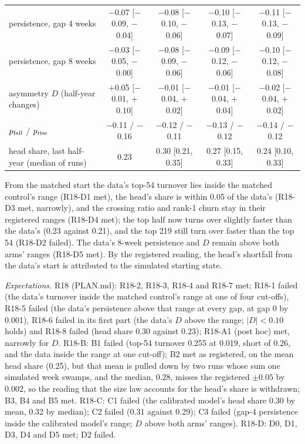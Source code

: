 \documentclass[10pt]{article}
\begin{document}
\begin{center}
{\begin{tabular}{lcccc}
persistence, gap 4 weeks & $-$0.07 [$-$0.09, $-$0.04] & $-$0.08 [$-$0.10, $-$0.06] & $-$0.10 [$-$0.13, $-$0.07] & $-$0.11 [$-$0.13, $-$0.09]\\
persistence, gap 8 weeks & $-$0.03 [$-$0.05, $-$0.00] & $-$0.08 [$-$0.09, $-$0.06] & $-$0.09 [$-$0.12, $-$0.06] & $-$0.10 [$-$0.12, $-$0.08]\\
asymmetry $D$ (half-year changes) & $+$0.05 [$-$0.01, $+$0.10] & $-$0.01 [$-$0.04, $+$0.02] & $-$0.01 [$-$0.04, $+$0.04] & $-$0.02 [$-$0.04, $+$0.02]\\
\quad $p_{\rm fall}$ / $p_{\rm rise}$ & $-$0.11 / $-$0.16 & $-$0.12 / $-$0.11 & $-$0.13 / $-$0.12 & $-$0.14 / $-$0.12\\
head share, last half-year (median of runs) & 0.23 & 0.30 [0.21, 0.35] & 0.27 [0.15, 0.33] & 0.24 [0.10, 0.33]\\
\bottomrule
\end{tabular}}\end{center}
From the matched start the data's top-54 turnover lies inside the matched control's range (R18-D1 met), the head's share is within 0.05 of the data's (R18-D3 met, narrowly), and the crossing ratio and rank-1 churn stay in their registered ranges (R18-D4 met); the top half now turns over slightly faster than the data's (0.23 against 0.21), and the top 219 still turn over faster than the top 54 (R18-D2 failed). The data's 8-week persistence and $D$ remain above both arms' ranges (R18-D5 met). By the registered reading, the head's shortfall from the data's start is attributed to the simulated starting state.

\emph{Expectations.} R18 (PLAN.md): R18-2, R18-3, R18-4 and R18-7 met; R18-1 failed (the data's turnover inside the matched control's range at one of four cut-offs), R18-5 failed (the data's persistence above that range at every gap, at gap 0 by 0.001), R18-6 failed in its first part (the data's $D$ above the range; $|D| < 0.10$ holds) and R18-8 failed (head share 0.30 against 0.23); R18-A1 (post hoc) met, narrowly for $D$. R18-B: B1 failed (top-54 turnover 0.255 at 0.019, short of 0.26, and the data inside the range at one cut-off); B2 met as registered, on the mean head share (0.25), but that mean is pulled down by two runs whose sum one simulated week swamps, and the median, 0.28, misses the registered $\pm0.05$ by 0.002, so the reading that the size law accounts for the head's share is withdrawn; B3, B4 and B5 met. R18-C: C1 failed (the calibrated model's head share 0.30 by mean, 0.32 by median); C2 failed (0.31 against 0.29); C3 failed (gap-4 persistence inside the calibrated model's range; $D$ above both arms' ranges). R18-D: D0, D1, D3, D4 and D5 met; D2 failed.
\end{document}
